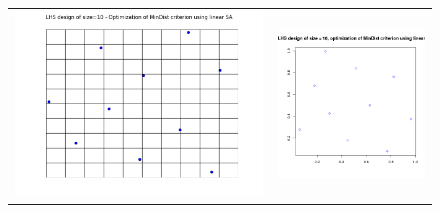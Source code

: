 \begin{figure}[!h]
\begin{center}
\begin{tabular}{>{\centering\arraybackslash}m{8cm}>{\centering\arraybackslash}m{8cm}}
 \includegraphics[scale=0.35]{lhs_sa_lin_10.png} & \includegraphics[scale=0.35]{dice_lhs_sa_lin_10.png}\\

\end{tabular}
\end{center}
\end{figure}
